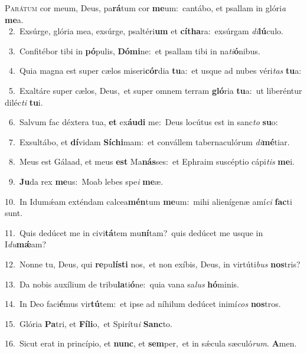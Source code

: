 \lettrine{\initial\textcolor{\initialcolor}{P}}{arátum} cor meum, Deus, pa\-\textbf{rá}\-tum cor \textbf{me}\-um:~\star cantábo, et psallam in glóri\textit{a} \textbf{me}\-a.\\
{\numbfont\textcolor{\numbcolor}{~2.}}~Exsúrge, glória mea, exsúrge, psaltéri\textbf{um} et \textbf{cí}\-\textbf{tha}ra:~\star exsúrgam \textit{di}\-\textbf{lú}culo.\par
{\numbfont\textcolor{\numbcolor}{~3.}}~Confitébor tibi in \textbf{pó}\-pulis, \textbf{Dó}\-\textbf{mi}ne:~\star et psallam tibi in na\-\textit{ti}\-\textbf{ó}nibus.\par
{\numbfont\textcolor{\numbcolor}{~4.}}~Quia magna est super cælos miseri\-\textbf{cór}\-dia \textbf{tu}\-a:~\star et usque ad nubes véri\textit{tas} \textbf{tu}\-a:\par
{\numbfont\textcolor{\numbcolor}{~5.}}~Exaltáre super cælos, Deus,~\dagger et super omnem terram \textbf{gló}\-ria \textbf{tu}\-a:~\star ut liberéntur diléc\textit{ti} \textbf{tu}\-i.\par
{\numbfont\textcolor{\numbcolor}{~6.}}~Salvum fac déxtera tua, \textbf{et} ex\-\textbf{áu}\-\textbf{di} me:~\star Deus locútus est in sanc\textit{to} \textbf{su}\-o:\par
{\numbfont\textcolor{\numbcolor}{~7.}}~Exsultábo, et \textbf{dí}\-vidam \textbf{Sí}\-\textbf{chi}mam:~\star et convállem tabernaculórum \textit{di}\-\textbf{mé}tiar.\par
{\numbfont\textcolor{\numbcolor}{~8.}}~Meus est Gálaad, et meus \textbf{est} Ma\-\textbf{nás}\-ses:~\star et Ephraim suscéptio cápi\textit{tis} \textbf{me}\-i.\par
{\numbfont\textcolor{\numbcolor}{~9.}}~\-\textbf{Ju}\-da rex \textbf{me}\-us:~\star Moab lebes spe\textit{i} \textbf{me}\-æ.\par
{\numbfont\textcolor{\numbcolor}{10.}}~In Idumǽam exténdam calcea\-\textbf{mén}\-tum \textbf{me}\-um:~\star mihi alienígenæ amí\textit{ci} \textbf{fac}\-ti sunt.\par
{\numbfont\textcolor{\numbcolor}{11.}}~Quis dedúcet me in civi\-\textbf{tá}\-tem mu\-\textbf{ní}\-tam?~\star quis dedúcet me usque in I\-\textit{du}\-\textbf{mǽ}am?\par
{\numbfont\textcolor{\numbcolor}{12.}}~Nonne tu, Deus, qui \textbf{re}\-pu\-\textbf{lís}\-\textbf{ti} nos,~\star et non exíbis, Deus, in virtúti\textit{bus} \textbf{nos}\-tris?\par
{\numbfont\textcolor{\numbcolor}{13.}}~Da nobis auxílium de tribu\-\textbf{la}\-ti\-\textbf{ó}\-ne:~\star quia vana sa\textit{lus} \textbf{hó}\-minis.\par
{\numbfont\textcolor{\numbcolor}{14.}}~In Deo faci\-\textbf{é}\-mus vir\-\textbf{tú}\-tem:~\star et ipse ad níhilum dedúcet inimí\textit{cos} \textbf{nos}\-tros.\par
{\numbfont\textcolor{\numbcolor}{15.}}~Glória \textbf{Pa}\-tri, et \textbf{Fí}\-\textbf{li}o,~\star et Spirítu\textit{i} \textbf{Sanc}\-to.\par
{\numbfont\textcolor{\numbcolor}{16.}}~Sicut erat in princípio, et \textbf{nunc}\-, et \textbf{sem}\-per,~\star et in sǽcula sæculó\-\textit{rum}\-. \textbf{A}\-men.\par
